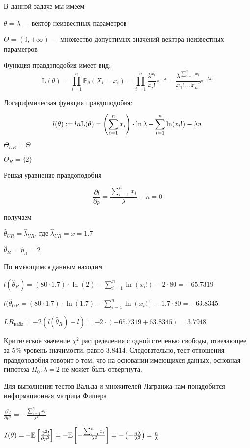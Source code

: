 \documentclass[pdftex,11pt,openany]{book}\usepackage[]{graphicx}\usepackage[]{color}
\begin{document}
\begin{solution}
В данной задаче мы имеем

$\theta = \lambda$ --- вектор неизвестных параметров

$\Theta = (0, +\infty)$ --- множество допустимых значений вектора неизвестных параметров

Функция правдоподобия имеет вид:
$$\text{L}(\theta) = \prod_{i=1}^n \mathbb{P}_{\theta}(X_i = x_i) = \prod_{i=1}^n \frac{\lambda^{x_i}}{x_i !} e^{-\lambda} = \frac{\lambda^{\sum_{i=1}^n x_i}}{x_1!\ldots x_n!}e^{-\lambda n}$$

Логарифмическая функция правдоподобия:

$$l(\theta) := \\ln \text{L}(\theta) = \left( \sum_{i=1}^n x_i \right) \cdot \ln\lambda - \sum_{i=1}^n \ln (x_i!) - \lambda n$$

$\Theta_{UR} = \Theta$

$\Theta_{R} = \{2\}$

Решая уравнение правдоподобия

$$\frac{\partial l}{\partial p} = \frac{\sum_{i=1}^n x_i}{\lambda} - n = 0$$

получаем

$\hat{\theta}_{UR} = \hat{\lambda}_{UR}$, где $\hat{\lambda}_{UR} = \overline{x} = 1.7$

$\hat{\theta}_{R} = \hat{p}_{R} = 2$

По имеющимся данным находим

$l(\hat{\theta}_{R}) = (80 \cdot 1.7) \cdot \ln(2) - \sum_{i=1}^n \ln (x_i!) - 2 \cdot 80 = -65.7319$

$l(\hat{\theta}_{UR} = (80 \cdot 1.7) \cdot \ln(1.7) - \sum_{i=1}^n \ln (x_i!) - 1.7 \cdot 80 = -63.8345$

$LR_{\text{набл}} = -2(l(\hat{\theta}_{R}) - l) = -2 \cdot (-65.7319 + 63.8345) = 3.7948$

Критическое значение $\chi^2$ распределения с одной степенью свободы, отвечающее за 5\% уровень значимости, равно 3.8414. Следовательно, тест отношения правдоподобия говорит о том, что на основании имеющихся данных, основная гипотеза $H_0: \lambda = 2$ не может быть отвергнута.

Для выполнения тестов Вальда и множителей Лагранжа нам понадобится информационная матрица Фишера

$\frac{\partial^2 l}{\partial p^2} = - \frac{\sum_{i=1}^n x_i}{\lambda^2}$

$I(\theta) = -\mathbb{E}\left[ \frac{\partial^2 l}{\partial p^2} \right] = -\mathbb{E} \left[ - \frac{\sum_{i=1}^n x_i}{\lambda^2} \right] = -\left(-\frac{n\lambda}{\lambda^2}\right) = \frac{n}{\lambda}$


\end{solution}
\end{document}
